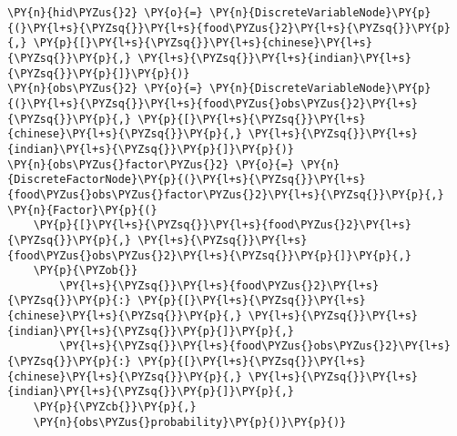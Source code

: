 \begin{example}
\begin{Verbatim}[commandchars=\\\{\}, fontsize=\relsize{-1}]
\PY{n}{hid\PYZus{}2} \PY{o}{=} \PY{n}{DiscreteVariableNode}\PY{p}{(}\PY{l+s}{\PYZsq{}}\PY{l+s}{food\PYZus{}2}\PY{l+s}{\PYZsq{}}\PY{p}{,} \PY{p}{[}\PY{l+s}{\PYZsq{}}\PY{l+s}{chinese}\PY{l+s}{\PYZsq{}}\PY{p}{,} \PY{l+s}{\PYZsq{}}\PY{l+s}{indian}\PY{l+s}{\PYZsq{}}\PY{p}{]}\PY{p}{)}
\PY{n}{obs\PYZus{}2} \PY{o}{=} \PY{n}{DiscreteVariableNode}\PY{p}{(}\PY{l+s}{\PYZsq{}}\PY{l+s}{food\PYZus{}obs\PYZus{}2}\PY{l+s}{\PYZsq{}}\PY{p}{,} \PY{p}{[}\PY{l+s}{\PYZsq{}}\PY{l+s}{chinese}\PY{l+s}{\PYZsq{}}\PY{p}{,} \PY{l+s}{\PYZsq{}}\PY{l+s}{indian}\PY{l+s}{\PYZsq{}}\PY{p}{]}\PY{p}{)}
\PY{n}{obs\PYZus{}factor\PYZus{}2} \PY{o}{=} \PY{n}{DiscreteFactorNode}\PY{p}{(}\PY{l+s}{\PYZsq{}}\PY{l+s}{food\PYZus{}obs\PYZus{}factor\PYZus{}2}\PY{l+s}{\PYZsq{}}\PY{p}{,} \PY{n}{Factor}\PY{p}{(}
    \PY{p}{[}\PY{l+s}{\PYZsq{}}\PY{l+s}{food\PYZus{}2}\PY{l+s}{\PYZsq{}}\PY{p}{,} \PY{l+s}{\PYZsq{}}\PY{l+s}{food\PYZus{}obs\PYZus{}2}\PY{l+s}{\PYZsq{}}\PY{p}{]}\PY{p}{,}
    \PY{p}{\PYZob{}}
        \PY{l+s}{\PYZsq{}}\PY{l+s}{food\PYZus{}2}\PY{l+s}{\PYZsq{}}\PY{p}{:} \PY{p}{[}\PY{l+s}{\PYZsq{}}\PY{l+s}{chinese}\PY{l+s}{\PYZsq{}}\PY{p}{,} \PY{l+s}{\PYZsq{}}\PY{l+s}{indian}\PY{l+s}{\PYZsq{}}\PY{p}{]}\PY{p}{,}
        \PY{l+s}{\PYZsq{}}\PY{l+s}{food\PYZus{}obs\PYZus{}2}\PY{l+s}{\PYZsq{}}\PY{p}{:} \PY{p}{[}\PY{l+s}{\PYZsq{}}\PY{l+s}{chinese}\PY{l+s}{\PYZsq{}}\PY{p}{,} \PY{l+s}{\PYZsq{}}\PY{l+s}{indian}\PY{l+s}{\PYZsq{}}\PY{p}{]}\PY{p}{,}
    \PY{p}{\PYZcb{}}\PY{p}{,}
    \PY{n}{obs\PYZus{}probability}\PY{p}{)}\PY{p}{)}


\end{Verbatim}
\end{example}
